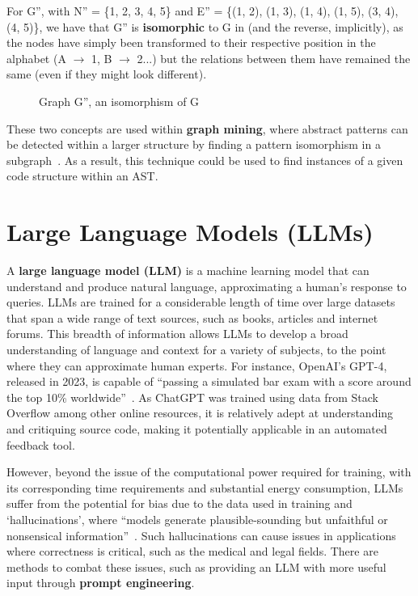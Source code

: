 For G'', with N'' = \{1, 2, 3, 4, 5\} and E'' = \{(1, 2), (1, 3), (1, 4), (1, 5), (3, 4), (4, 5)\}, we have that G'' is \textbf{isomorphic} to G in  (and the reverse, implicitly), as the nodes have simply been transformed to their respective position in the alphabet (A $\rightarrow$ 1, B $\rightarrow$ 2...) but the relations between them have remained the same (even if they might look different).

\begin{figure}[H]
    \centering
    
    \caption{Graph G'', an isomorphism of G}
    \label{fig:example-isomorphism}
\end{figure}

These two concepts are used within \textbf{graph mining}, where abstract patterns can be detected within a larger structure by finding a pattern isomorphism in a subgraph~\cite{GraphMining}. As a result, this technique could be used to find instances of a given code structure within an AST. 

\section{Large Language Models (LLMs)}
\label{section:LLMs}
A \textbf{large language model (LLM)} is a machine learning model that can understand and produce natural language, approximating a human's response to queries. LLMs are trained for a considerable length of time over large datasets that span a wide range of text sources, such as books, articles and internet forums. This breadth of information allows LLMs to develop a broad understanding of language and context for a variety of subjects, to the point where they can approximate human experts. For instance, OpenAI's GPT-4, released in 2023, is capable of ``passing a simulated bar exam with a score around the top 10\% worldwide''~\cite{GPT4Report}. As ChatGPT was trained using data from Stack Overflow among other online resources, it is relatively adept at understanding and critiquing source code, making it potentially applicable in an automated feedback tool.

However, beyond the issue of the computational power required for training, with its corresponding time requirements and substantial energy consumption, LLMs suffer from the potential for bias due to the data used in training and `hallucinations', where ``models generate plausible-sounding but unfaithful or nonsensical information''~\cite{LLMHallucinations}. Such hallucinations can cause issues in applications where correctness is critical, such as the medical and legal fields. There are methods to combat these issues, such as providing an LLM with more useful input through \textbf{prompt engineering}.


